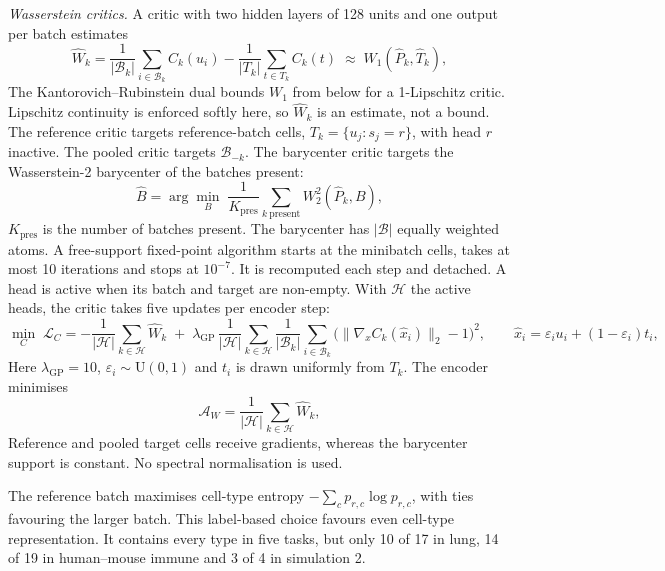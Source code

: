 \noindent\textit{Wasserstein critics.} A critic with two hidden layers of 128 units and one output per batch estimates
\begin{equation}
\hat W_k=\frac1{|\mathcal{B}_k|}\sum_{i\in\mathcal{B}_k}C_k(u_i)-\frac1{|T_k|}\sum_{t\in T_k}C_k(t)\;\approx\;W_1(\hat P_k,\hat T_k),
\label{eq:s1-w1}
\end{equation}
The Kantorovich--Rubinstein dual bounds $W_1$ from below for a 1-Lipschitz critic. Lipschitz continuity is enforced softly here, so $\hat W_k$ is an estimate, not a bound. The reference critic targets reference-batch cells, $T_k=\{u_j:s_j=r\}$, with head $r$ inactive. The pooled critic targets $\mathcal{B}_{-k}$. The barycenter critic targets the Wasserstein-2 barycenter of the batches present:
\begin{equation}
\hat B=\arg\min_{B}\;\frac1{K_{\mathrm{pres}}}\sum_{k\ \mathrm{present}} W_2^2(\hat P_k,B),
\label{eq:s1-bary}
\end{equation}
$K_{\mathrm{pres}}$ is the number of batches present. The barycenter has $|\mathcal{B}|$ equally weighted atoms. A free-support fixed-point algorithm starts at the minibatch cells, takes at most 10 iterations and stops at $10^{-7}$. It is recomputed each step and detached. A head is active when its batch and target are non-empty. With $\mathcal{H}$ the active heads, the critic takes five updates per encoder step:
\begin{equation}
\min_C\;\mathcal{L}_C=-\frac1{|\mathcal{H}|}\sum_{k\in\mathcal{H}}\hat W_k\;+\;\lambda_{\mathrm{GP}}\,\frac1{|\mathcal{H}|}\sum_{k\in\mathcal{H}}\frac1{|\mathcal{B}_k|}\sum_{i\in\mathcal{B}_k}\Big(\big\lVert\nabla_{x}C_k(\hat x_i)\big\rVert_2-1\Big)^2,\qquad \hat x_i=\varepsilon_i u_i+(1-\varepsilon_i)t_i,
\label{eq:s1-gp}
\end{equation}
Here $\lambda_{\mathrm{GP}}=10$, $\varepsilon_i\sim\mathrm{U}(0,1)$ and $t_i$ is drawn uniformly from $T_k$. The encoder minimises
\begin{equation}
\mathcal{A}_{W}=\frac1{|\mathcal{H}|}\sum_{k\in\mathcal{H}}\hat W_k ,
\label{eq:s1-aw}
\end{equation}
Reference and pooled target cells receive gradients, whereas the barycenter support is constant. No spectral normalisation is used.

The reference batch maximises cell-type entropy $-\sum_c p_{r,c}\log p_{r,c}$, with ties favouring the larger batch. This label-based choice favours even cell-type representation. It contains every type in five tasks, but only 10 of 17 in lung, 14 of 19 in human--mouse immune and 3 of 4 in simulation 2.

